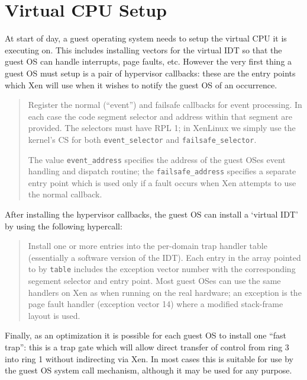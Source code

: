 \documentclass[11pt,twoside,final,openright]{xenstyle}
\begin{document}
\section{Virtual CPU Setup} 

At start of day, a guest operating system needs to setup the virtual
CPU it is executing on. This includes installing vectors for the
virtual IDT so that the guest OS can handle interrupts, page faults,
etc. However the very first thing a guest OS must setup is a pair 
of hypervisor callbacks: these are the entry points which Xen will
use when it wishes to notify the guest OS of an occurrence. 

\begin{quote}

Register the normal (``event'') and failsafe callbacks for 
event processing. In each case the code segment selector and 
address within that segment are provided. The selectors must
have RPL 1; in XenLinux we simply use the kernel's CS for both 
{\tt event\_selector} and {\tt failsafe\_selector}.

The value {\tt event\_address} specifies the address of the guest OSes
event handling and dispatch routine; the {\tt failsafe\_address}
specifies a separate entry point which is used only if a fault occurs
when Xen attempts to use the normal callback. 
\end{quote} 


After installing the hypervisor callbacks, the guest OS can 
install a `virtual IDT' by using the following hypercall: 

\begin{quote} 

Install one or more entries into the per-domain 
trap handler table (essentially a software version of the IDT). 
Each entry in the array pointed to by {\tt table} includes the 
exception vector number with the corresponding segement selector 
and entry point. Most guest OSes can use the same handlers on 
Xen as when running on the real hardware; an exception is the 
page fault handler (exception vector 14) where a modified 
stack-frame layout is used. 


\end{quote} 

Finally, as an optimization it is possible for each guest OS 
to install one ``fast trap'': this is a trap gate which will 
allow direct transfer of control from ring 3 into ring 1 without
indirecting via Xen. In most cases this is suitable for use by 
the guest OS system call mechanism, although it may be used for
any purpose. 
\end{document}
